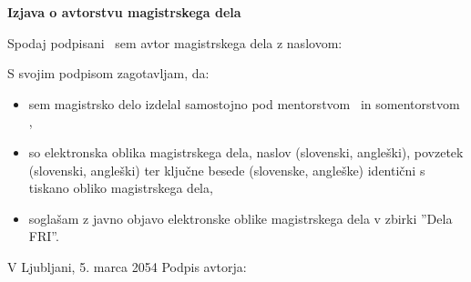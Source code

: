 \vspace*{1cm}
\begin{center}
{\Large \textbf{\sc Izjava o avtorstvu magistrskega dela}}
\end{center}

\vspace{1cm}
\noindent Spodaj podpisani \myname\ sem avtor magistrskega dela z naslovom:

\vspace{0.5cm}
\begin{center}
\emph{\mytitle}
\end{center}

\vspace{1cm}
\noindent S svojim podpisom zagotavljam, da:
\begin{itemize}
	\item sem magistrsko delo izdelal samostojno pod mentorstvom \mysupervisor\ in somentorstvom \mycosupervisor,

	\item so elektronska oblika magistrskega dela, naslov (slovenski, angleški), povzetek (slovenski, angleški) ter ključne besede (slovenske, angleške) identični s tiskano obliko magistrskega dela,
	\item soglašam z javno objavo elektronske oblike magistrskega dela v zbirki ''Dela FRI''.
\end{itemize}

\vspace{1cm}
\noindent V Ljubljani, 5. marca 2054 \hfill Podpis avtorja: